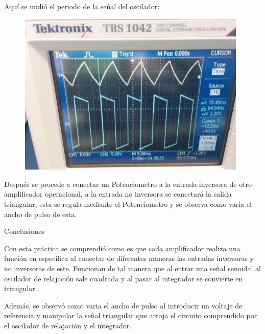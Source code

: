 \documentclass[12pt]{article}
\begin{document}

\par

\begin{Center}
\textcolor[HTML]{656565}{Aquí se midió el periodo de la señal del oscilador:} 
\end{Center}\par




\begin{figure}[H]
	\begin{Center}
		\includegraphics[width=4.31in,height=3.08in]{./media/image18.png}
	\end{Center}
\end{figure}



\par

\begin{Center}
\textcolor[HTML]{656565}{Después se procede a conectar un Potenciometro a la entrada inversora de otro amplificador operacional, a la entrada no inversora se conectará la salida triangular, esta se regula mediante el Potenciometro y se observa como varia el ancho de pulso de esta.}
\end{Center}\par

\setlength{\parskip}{8.04pt}
\textcolor[HTML]{33CCCC}{Conclusiones}\par

\textcolor[HTML]{656565}{Con esta práctica se comprendió como es que cada amplificador realiza una función en especifica al conectar de diferentes maneras las entradas inversoras y no inversoras de este. Funcionan de tal manera que al entrar una señal senoidal al oscilador de relajación sale cuadrada y al pasar al integrador se convierte en triangular.}\par

\textcolor[HTML]{656565}{Además, se observó como varia el ancho de pulso al introducir un voltaje de referencia y manipular la señal triangular que arroja el circuito comprendido por el oscilador de relajación y el integrador.}\par


\vspace{\baselineskip}

\printbibliography
\end{document}
